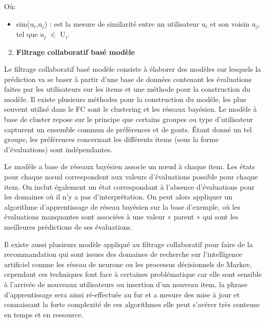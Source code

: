 \documentclass[a4paper,12pt,letterpaper,headsepline,singlespacing,headsepline, french]{report}
\begin{document}
\begin{itemize}
\begin{enumerate}
Où: 
\begin{itemize}
	\item sim(u$_{i}$,u$_{j}$) : est la mesure de similarité entre un utilisateur u$_{i}$ et son voisin u$_{j}$, tel que u$_{j}$ $\in$ U$_{i}$.

\end{itemize}


\end{enumerate}
\end{itemize}

\begin{enumerate}[nosep,label=\textbf{\arabic*)}]
	\setcounter{enumi}{1}
	\item \textbf{Filtrage collaboratif basé modèle}
\end{enumerate}\mbox{}\indent Le filtrage collaboratif basé modèle consiste à élaborer des modèles sur lesquels la prédiction va se baser à partir d’une base de données contenant les évaluations faites par les utilisateurs sur les items et une méthode pour la construction du modèle. Il existe plusieurs méthodes pour la construction du modèle, les plus souvent utilisé dans le FC sont le clustering et les réseaux bayésien. 
Le modèle à base de cluster repose sur le principe que certains groupes ou type d’utilisateur capturent un ensemble commun de préférences et de gouts. Étant donné un tel groupe, les préférences concernant les différents items (sous la forme d’évaluations) sont indépendantes. 

Le modèle a base de réseaux bayésien associe un nœud à chaque item. Les états pour chaque nœud correspondent aux valeurs d'évaluations possible pour chaque item. On inclut également un état correspondant à l’absence d’évaluations pour les domaines où il n’y a pas d’interprétation. On peut alors appliquer un algorithme d’apprentissage de réseau bayésien sur la base d’exemple, où les évaluations manquantes sont associées à une valeur « parent » qui sont les meilleures prédictions de ses évaluations\cite{ref10}.

Il existe aussi plusieurs modèle appliqué au filtrage collaboratif pour faire de la recommandation qui sont issues des domaines de recherche sur l’intelligence artificiel comme les réseau de neurone ou les processus décisionnels de Markov, cependant ces techniques font face à certaines problématique car elle sont sensible à l’arrivée de nouveaux utilisateurs ou insertion d’un nouveau item, la phrase d’apprentissage sera ainsi  ré-effectuée au fur et a mesure des mise à jour et connaissant la forte complexité de ces algorithmes elle peut s’avérer très conteuse en temps et en ressource\cite{ref35}. 
\end{document}
